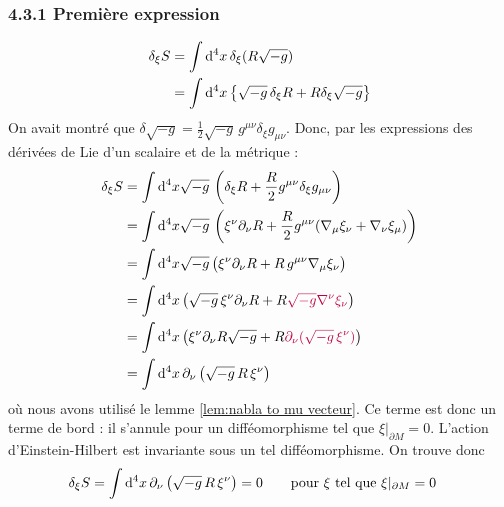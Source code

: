 \subsubsection{4.3.1 Première expression}
\begin{align}
    \delta_{\xi}S &= \int \mathrm{d}^4 x \, \delta_{\xi}(R\sqrt{-g})\\
    &=  \int \mathrm{d}^4 x \left\{ \sqrt{-g}\, \delta_{\xi}R + R\delta_{\xi}\sqrt{-g} \right\}
\end{align}
On avait montré que $\delta \sqrt{-g} = \frac{1}{2}\sqrt{-g}\, g^{\mu \nu}\delta_{\xi} g_{\mu \nu}$. Donc, par les expressions des dérivées de Lie d'un scalaire et de la métrique :
\begin{align}
     \delta_{\xi}S &=\int \mathrm{d}^4 x \sqrt{-g} \, \left(\delta_{\xi}R + \frac{R}{2}g^{\mu \nu}\delta_\xi g_{\mu \nu}\right)\\
     &= \int \mathrm{d} ^4x \sqrt{-g}\, \left(\xi^{\nu}\partial_{\nu}R + \frac{R}{2}g^{\mu \nu} (\nabla_{\mu}\xi_{\nu} + \nabla_{\nu}\xi_{\mu})\right)\\
     &= \int \mathrm{d}^4 x \sqrt{-g} \, \big(\xi^{\nu}\partial_{\nu}R + R \,g^{\mu \nu} \nabla_{\mu}\xi_{\nu}\big)\\
     &= \int \mathrm{d} ^4x \left( \sqrt{-g} \, \xi^{\nu}\partial_{\nu}R + R\textcolor{purple}{\sqrt{-g}\nabla^{\nu}\xi_{\nu}}\right)\\
     &=\int \mathrm{d} ^4x \left(\xi^{\nu}\partial_{\nu}R\sqrt{-g} + R \textcolor{purple}{\partial_{\nu}(\sqrt{-g}\,\xi^{\nu})}\right)\\
     &=\int \mathrm{d} ^4x \, \partial_\nu \left( \sqrt{-g} \, R\,\xi^{\nu}\right)
\end{align}
où nous avons utilisé le lemme \ref{lem:nabla to mu vecteur}. Ce terme est donc un terme de bord : il s'annule pour un difféomorphisme tel que $\xi|_{\partial M} = 0$. L'action d'Einstein-Hilbert est invariante sous un tel difféomorphisme. On trouve donc 
\begin{align}
    \delta_{\xi}S &=\int \mathrm{d} ^4x \, \partial_\nu \left(\sqrt{-g} \, R\,\xi^{\nu}\right) = 0 \quad \quad\text{pour } \xi \text{ tel que } \xi |_{\partial M} = 0
\end{align}
